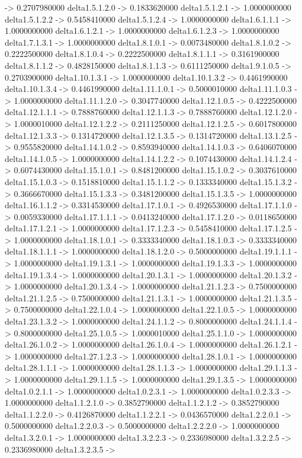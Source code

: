 -> 0.2707980000    delta1.5.1.2.0 -> 0.1833620000    delta1.5.1.2.1 -> 1.0000000000    delta1.5.1.2.2 -> 0.5458410000    delta1.5.1.2.4 -> 1.0000000000    delta1.6.1.1.1 -> 1.0000000000    delta1.6.1.2.1 -> 1.0000000000    delta1.6.1.2.3 -> 1.0000000000    delta1.7.1.3.1 -> 1.0000000000    delta1.8.1.0.1 -> 0.0073480000    delta1.8.1.0.2 -> 0.2222500000    delta1.8.1.0.4 -> 0.2222500000    delta1.8.1.1.1 -> 0.3161900000    delta1.8.1.1.2 -> 0.4828150000    delta1.8.1.1.3 -> 0.6111250000    delta1.9.1.0.5 -> 0.2703900000    delta1.10.1.3.1 -> 1.0000000000    delta1.10.1.3.2 -> 0.4461990000    delta1.10.1.3.4 -> 0.4461990000    delta1.11.1.0.1 -> 0.5000010000    delta1.11.1.0.3 -> 1.0000000000    delta1.11.1.2.0 -> 0.3047740000    delta1.12.1.0.5 -> 0.4222500000    delta1.12.1.1.1 -> 0.7888760000    delta1.12.1.1.3 -> 0.7888760000    delta1.12.1.2.0 -> 1.0000010000    delta1.12.1.2.2 -> 0.2111250000    delta1.12.1.2.5 -> 0.6017800000    delta1.12.1.3.3 -> 0.1314720000    delta1.12.1.3.5 -> 0.1314720000    delta1.13.1.2.5 -> 0.9555820000    delta1.14.1.0.2 -> 0.8593940000    delta1.14.1.0.3 -> 0.6406070000    delta1.14.1.0.5 -> 1.0000000000    delta1.14.1.2.2 -> 0.1074430000    delta1.14.1.2.4 -> 0.6074430000    delta1.15.1.0.1 -> 0.8481200000    delta1.15.1.0.2 -> 0.3037610000    delta1.15.1.0.3 -> 0.1518810000    delta1.15.1.1.2 -> 0.1333340000    delta1.15.1.3.2 -> 0.3666670000    delta1.15.1.3.3 -> 0.3481200000    delta1.15.1.3.5 -> 1.0000000000    delta1.16.1.1.2 -> 0.3314530000    delta1.17.1.0.1 -> 0.4926530000    delta1.17.1.1.0 -> 0.0059330000    delta1.17.1.1.1 -> 0.0413240000    delta1.17.1.2.0 -> 0.0118650000    delta1.17.1.2.1 -> 1.0000000000    delta1.17.1.2.3 -> 0.5458410000    delta1.17.1.2.5 -> 1.0000000000    delta1.18.1.0.1 -> 0.3333340000    delta1.18.1.0.3 -> 0.3333340000    delta1.18.1.1.1 -> 1.0000000000    delta1.18.1.2.0 -> 0.5000000000    delta1.19.1.1.1 -> 1.0000000000    delta1.19.1.3.1 -> 1.0000000000    delta1.19.1.3.3 -> 1.0000000000    delta1.19.1.3.4 -> 1.0000000000    delta1.20.1.3.1 -> 1.0000000000    delta1.20.1.3.2 -> 1.0000000000    delta1.20.1.3.4 -> 1.0000000000    delta1.21.1.2.3 -> 0.7500000000    delta1.21.1.2.5 -> 0.7500000000    delta1.21.1.3.1 -> 1.0000000000    delta1.21.1.3.5 -> 0.7500000000    delta1.22.1.0.4 -> 1.0000000000    delta1.22.1.0.5 -> 1.0000000000    delta1.23.1.3.2 -> 1.0000000000    delta1.24.1.1.2 -> 0.8000000000    delta1.24.1.1.4 -> 0.8000000000    delta1.25.1.0.5 -> 1.0000010000    delta1.25.1.1.0 -> 1.0000000000    delta1.26.1.0.2 -> 1.0000000000    delta1.26.1.0.4 -> 1.0000000000    delta1.26.1.2.1 -> 1.0000000000    delta1.27.1.2.3 -> 1.0000000000    delta1.28.1.0.1 -> 1.0000000000    delta1.28.1.1.1 -> 1.0000000000    delta1.28.1.1.3 -> 1.0000000000    delta1.29.1.1.3 -> 1.0000000000    delta1.29.1.1.5 -> 1.0000000000    delta1.29.1.3.5 -> 1.0000000000    delta1.0.2.1.1 -> 1.0000000000    delta1.0.2.3.1 -> 1.0000000000    delta1.0.2.3.3 -> 1.0000000000    delta1.1.2.1.0 -> 0.3852790000    delta1.1.2.1.2 -> 0.3852790000    delta1.1.2.2.0 -> 0.4126870000    delta1.1.2.2.1 -> 0.0436570000    delta1.2.2.0.1 -> 0.5000000000    delta1.2.2.0.3 -> 0.5000000000    delta1.2.2.2.0 -> 1.0000000000    delta1.3.2.0.1 -> 1.0000000000    delta1.3.2.2.3 -> 0.2336980000    delta1.3.2.2.5 -> 0.2336980000    delta1.3.2.3.5 -> 